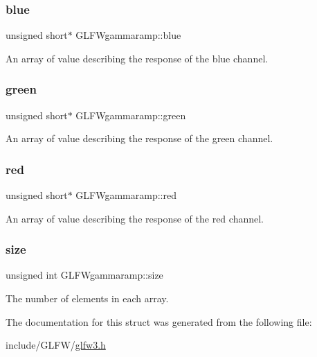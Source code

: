 \subsubsection{\texorpdfstring{blue}{blue}}
{\footnotesize\ttfamily unsigned short$\ast$ G\+L\+F\+Wgammaramp\+::blue}

An array of value describing the response of the blue channel. \mbox{\label{structGLFWgammaramp_affccc6f5df47820b6562d709da3a5a3a}} 
\subsubsection{\texorpdfstring{green}{green}}
{\footnotesize\ttfamily unsigned short$\ast$ G\+L\+F\+Wgammaramp\+::green}

An array of value describing the response of the green channel. \mbox{\label{structGLFWgammaramp_a2cce5d968734b685623eef913e635138}} 
\subsubsection{\texorpdfstring{red}{red}}
{\footnotesize\ttfamily unsigned short$\ast$ G\+L\+F\+Wgammaramp\+::red}

An array of value describing the response of the red channel. \mbox{\label{structGLFWgammaramp_ad620e1cffbff9a32c51bca46301b59a5}} 
\subsubsection{\texorpdfstring{size}{size}}
{\footnotesize\ttfamily unsigned int G\+L\+F\+Wgammaramp\+::size}

The number of elements in each array. 

The documentation for this struct was generated from the following file\+:\begin{DoxyCompactItemize}
\item 
include/\+G\+L\+F\+W/\hyperlink{glfw3_8h}{glfw3.\+h}\end{DoxyCompactItemize}
